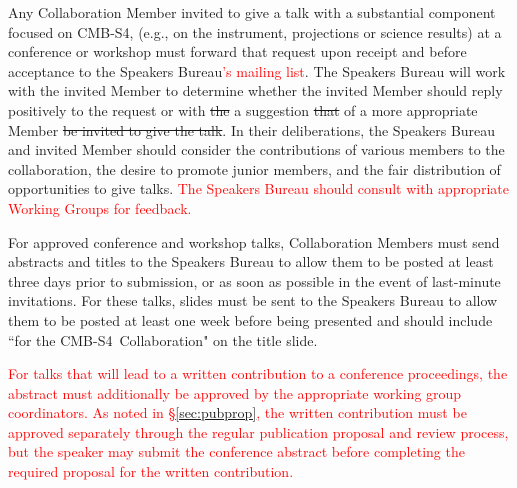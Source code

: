 \documentclass[12pt]{article}
\newcommand\collabname{CMB-S4}
\newcommand{\revision}[1]{\textcolor{Red}{#1}}
\newcommand{\revtwo}[1]{\textcolor{Emerald}{#1}}
\begin{document}
Any Collaboration Member invited to give a talk with a substantial component focused on \collabname, (e.g., on the instrument, projections or science results) at a conference or workshop must forward that request upon receipt and before acceptance to the Speakers Bureau\revision{'s mailing list}.  The Speakers Bureau will work with the invited Member to determine whether the invited Member should reply \revtwo{positively} to the request \revtwo{or} with \revtwo{\sout{the} a} suggestion \revtwo{\sout{that} of} a more appropriate Member \revtwo{\sout{be invited to give the talk}}. In their deliberations, the Speakers Bureau and invited Member should consider
the contributions of various members to the collaboration, the desire to promote junior members, and the fair distribution of opportunities to give talks. \revision{The Speakers Bureau should consult with appropriate Working Groups for feedback.}

For approved conference and workshop talks, Collaboration Members must send abstracts and titles to the Speakers Bureau to allow them to be posted at least three days prior to submission, or as soon as possible in the event of last-minute invitations. For these talks, slides must be sent to the Speakers Bureau to allow them to be posted at least one week before being presented and should include ``for the \collabname\ Collaboration" on the title slide. %

\revision{For talks that will lead to a written contribution to a conference proceedings, the abstract must additionally be approved by the appropriate working group coordinators.  As noted in \S\ref{sec:pubprop}, the written contribution must be approved separately through the regular publication proposal and review process, but the speaker may submit the conference abstract before completing the required proposal for the written contribution.}
\end{document}
